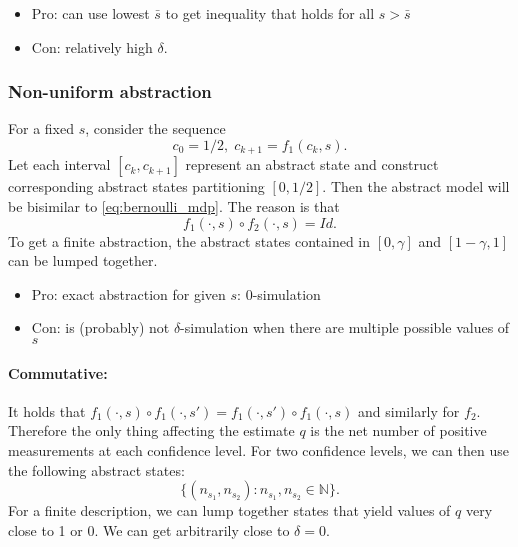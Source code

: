 \documentclass[conference]{IEEEtran}
\begin{document}
\begin{itemize}
  \item Pro: can use lowest $\bar s$ to get inequality that holds for all $s > \bar s$
  \item Con: relatively high $\delta$.
\end{itemize}

\subsubsection{Non-uniform abstraction}

For a fixed $s$, consider the sequence
\begin{equation}
  c_0 = 1/2, \; c_{k+1} = f_1(c_k, s).
\end{equation}
Let each interval $[c_k, c_{k+1}]$ represent an abstract state and construct corresponding abstract states partitioning $[0, 1/2]$. Then the abstract model will be bisimilar to \eqref{eq:bernoulli_mdp}. The reason is that 
\begin{equation}
  f_1(\cdot, s) \circ f_2(\cdot, s) = Id.
\end{equation}
To get a finite abstraction, the abstract states contained in $[0, \gamma]$ and $[1- \gamma, 1]$ can be lumped together.

\begin{itemize}
  \item Pro: exact abstraction for given $s$: $0$-simulation
  \item Con: is (probably) not $\delta$-simulation when there are multiple possible values of $s$
\end{itemize}

\paragraph{Commutative:} It holds that $f_1(\cdot, s) \circ f_1(\cdot, s') = f_1(\cdot, s') \circ f_1(\cdot, s)$ and similarly for $f_2$. Therefore the only thing affecting the estimate $q$ is the net number of positive measurements at each confidence level. For two confidence levels, we can then use the following abstract states:
\begin{equation}
  \{ (n_{s_1}, n_{s_2}) : n_{s_1}, n_{s_2} \in \mathbb{N} \}. 
\end{equation}
For a finite description, we can lump together states that yield values of $q$ very close to 1 or 0. We can get arbitrarily close to $\delta = 0$.



\printbibliography
\end{document}

